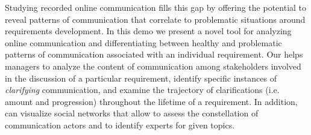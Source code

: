 
Studying recorded online communication fills this gap by offering the potential to reveal patterns of communication that correlate to problematic situations around requirements development. 
In this demo we present a novel tool for analyzing online communication and differentiating between healthy and problematic patterns of communication associated with an individual requirement. 
Our \viss helps managers to analyze the content of communication among stakeholders involved in the discussion of a particular requirement, identify specific instances of \emph{clarifying} communication, and examine the trajectory of clarifications (i.e. amount and progression) throughout the lifetime of a requirement. 
In addition, \viss can visualize social networks that allow to assess the constellation of communication actors and to identify experts for given topics.



